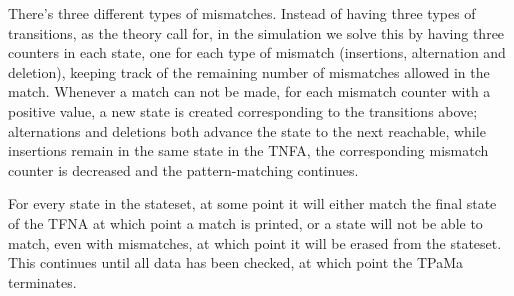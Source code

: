 There's three different types of mismatches. Instead of having three types of transitions, as the theory call for, in the simulation we solve this by having three counters in each state, one for each type of mismatch (insertions, alternation and deletion), keeping track of the remaining number of mismatches allowed in the match. Whenever a match can not be made, for each mismatch counter with a positive value, a new state is created corresponding to the transitions above; alternations and deletions both advance the state to the next reachable, while insertions remain in the same state in the TNFA, the corresponding mismatch counter is decreased and the pattern-matching continues.

For every state in the stateset, at some point it will either match the final state of the TFNA at which point a match is printed, or a state will not be able to match, even with mismatches, at which point it will be erased from the stateset. This continues until all data has been checked, at which point the TPaMa terminates.